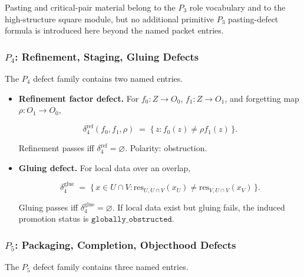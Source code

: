 \documentclass[11pt]{article}
\theoremstyle{definition}
\begin{document}
Pasting and critical-pair material belong to the \(P_3\) role vocabulary and to the high-structure square module, but no additional primitive \(P_3\) pasting-defect formula is introduced here beyond the named packet entries.

\subsubsection{\texorpdfstring{\(P_4\): Refinement, Staging, Gluing Defects}{P\_4: Refinement, Staging, Gluing Defects}}

The \(P_4\) defect family contains two named entries.

\begin{itemize}
\item
  \textbf{Refinement factor defect.} For \(f_0:Z\to O_0\), \(f_1:Z\to O_1\), and forgetting map \(\rho:O_1\to O_0\),

  \[
  \delta_4^{\mathrm{ref}}(f_0,f_1,\rho)\;=\;\{\,z:f_0(z)\neq\rho f_1(z)\,\}.
  \]

  Refinement passes iff \(\delta_4^{\mathrm{ref}}=\varnothing\). Polarity: obstruction.
\item
  \textbf{Gluing defect.} For local data over an overlap,

  \[
  \delta_4^{\mathrm{glue}}\;=\;\{\,x\in U\cap V:\mathrm{res}_{U,U\cap V}(x_U)\neq\mathrm{res}_{V,U\cap V}(x_V)\,\}.
  \]

  Gluing passes iff \(\delta_4^{\mathrm{glue}}=\varnothing\). If local data exist but gluing fails, the induced promotion status is \(\texttt{globally\_obstructed}\).
\end{itemize}

\subsubsection{\texorpdfstring{\(P_5\): Packaging, Completion, Objecthood Defects}{P\_5: Packaging, Completion, Objecthood Defects}}

The \(P_5\) defect family contains three named entries.
\end{document}
